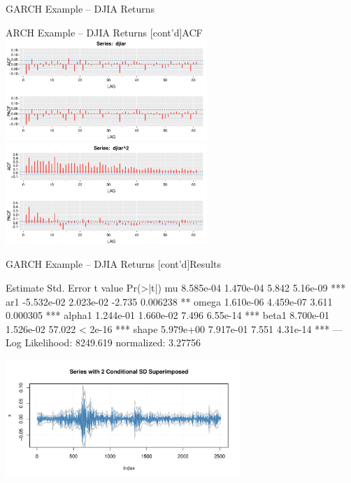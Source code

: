 \documentclass[ignorenonframetext,xcolor=x11names]{beamer}
\begin{document}
\begin{frame}[fragile]{GARCH Example -- DJIA Returns}
\end{frame}

\begin{frame}{ARCH Example -- DJIA Returns \small [cont'd]}{ACF}
\centering
\includegraphics[height=1.5in]{figure36.pdf}
\includegraphics[height=1.5in]{figure37.pdf}
\end{frame}

\begin{frame}[fragile]{GARCH Example -- DJIA Returns \small [cont'd]}{Results}
\begin{textcode}
         Estimate  Std. Error  t value Pr(>|t|)    
mu      8.585e-04   1.470e-04    5.842 5.16e-09 ***
ar1    -5.532e-02   2.023e-02   -2.735 0.006238 ** 
omega   1.610e-06   4.459e-07    3.611 0.000305 ***
alpha1  1.244e-01   1.660e-02    7.496 6.55e-14 ***
beta1   8.700e-01   1.526e-02   57.022  < 2e-16 ***
shape   5.979e+00   7.917e-01    7.551 4.31e-14 ***
---
Log Likelihood:
 8249.619    normalized:  3.27756 
\end{textcode}

\vspace{-\baselineskip}
\begin{center}
\includegraphics[height=1.75in]{figure38.pdf}
\end{center}
\end{frame}
\end{document}
